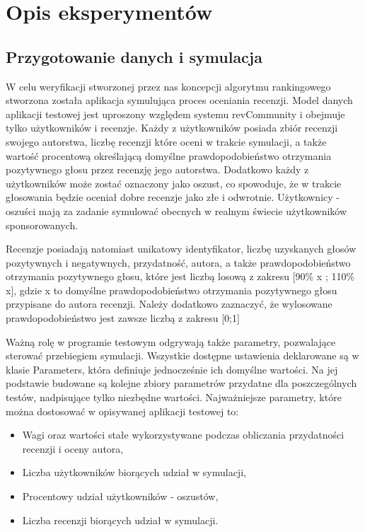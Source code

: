 \section{Opis eksperymentów}

\subsection{Przygotowanie danych i symulacja}

W celu weryfikacji stworzonej przez nas koncepcji algorytmu rankingowego stworzona została aplikacja symulująca proces oceniania recenzji. Model danych aplikacji testowej jest uproszony względem systemu revCommunity i obejmuje tylko użytkowników i recenzje. 
Każdy z użytkowników posiada zbiór recenzji swojego autorstwa, liczbę recenzji które oceni w trakcie symulacji, a także wartość procentową określającą  domyślne prawdopodobieństwo otrzymania pozytywnego głosu przez recenzję jego autorstwa. Dodatkowo każdy z użytkowników może zostać oznaczony jako oszust, co spowoduje, że w trakcie głosowania będzie oceniał dobre recenzje jako złe i odwrotnie. Użytkownicy - oszuści mają za zadanie symulować obecnych w realnym świecie użytkowników sponsorowanych.

Recenzje posiadają natomiast unikatowy identyfikator, liczbę uzyskanych głosów pozytywnych i negatywnych, przydatność, autora, a także prawdopodobieństwo otrzymania pozytywnego głosu, które jest liczbą losową z zakresu [90\% x ; 110\% x], gdzie x to domyślne prawdopodobieństwo otrzymania pozytywnego głosu przypisane do autora recenzji. Należy dodatkowo zaznaczyć, że wylosowane prawdopodobieństwo jest zawsze liczbą z zakresu [0;1]

Ważną rolę w programie testowym odgrywają także parametry, pozwalające sterować przebiegiem symulacji. Wszystkie dostępne ustawienia deklarowane są w klasie Parameters, która definiuje jednocześnie ich domyślne wartości. Na jej podstawie budowane są kolejne zbiory parametrów przydatne dla poszczególnych testów, nadpisujące tylko niezbędne wartości. Najważniejsze parametry, które można dostosować w opisywanej aplikacji testowej to:

\begin{itemize}
\item Wagi oraz wartości stałe wykorzystywane podczas obliczania przydatności recenzji i oceny autora,
\item Liczba użytkowników biorących udział w symulacji,
\item Procentowy udział użytkowników - oszustów,
\item Liczba recenzji biorących udział w symulacji.
\end{itemize}


